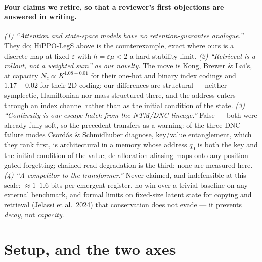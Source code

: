 \documentclass{article}
\begin{document}
{\footnotesize\paragraph{Four claims we retire, so that a reviewer's first objections are answered in writing.} \emph{(1) ``Attention and state-space models have no retention-guarantee analogue.''} They do; HiPPO-LegS above is the counterexample, exact where ours is a discrete map at fixed $\varepsilon$ with $h=\varepsilon\mu<2$ a hard stability limit. \emph{(2) ``Retrieval is a rollout, not a weighted sum'' as our novelty.} The move is Kong, Brewer \& Lai's, at capacity $N_c\propto K^{1.08\pm0.01}$ for their one-hot and binary index codings and $1.17\pm0.02$ for their 2D coding; our differences are structural --- neither symplectic, Hamiltonian nor mass-structured there, and the address enters through an index channel rather than as the initial condition of the state. \emph{(3) ``Continuity is our escape hatch from the NTM/DNC lineage.''} False --- both were already fully soft, so the precedent transfers as a warning: of the three DNC failure modes Csord\'as \& Schmidhuber diagnose, key/value entanglement, which they rank first, is architectural in a memory whose address $q_0$ is both the key and the initial condition of the value; de-allocation aliasing maps onto any position-gated forgetting; chained-read degradation is the third; none are measured here. \emph{(4) ``A competitor to the transformer.''} Never claimed, and indefensible at this scale: $\approx1$--$1.6$ bits per emergent register, no win over a trivial baseline on any external benchmark, and formal limits on fixed-size latent state for copying and retrieval (Jelassi et al.\ 2024) that conservation does not evade --- it prevents \emph{decay}, not \emph{capacity}.\par}

\section{Setup, and the two axes}\label{sec:setup}
\end{document}
